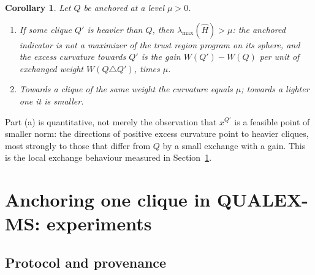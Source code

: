 \documentclass[11pt]{article}
\newtheorem{cor}[thm]{Corollary}
\theoremstyle{definition}
\theoremstyle{remark}
\newcommand{\hH}{\hat{H}}
\newcommand{\lmax}{\lambda_{\max}}
\begin{document}
\begin{cor}
\label{cor:curv}
Let $Q$ be anchored at a level $\mu>0$.
\begin{enumerate}
\item[(a)] If some clique $Q'$ is heavier than $Q$, then $\lmax(\hH)>\mu$:
the anchored indicator is not a maximizer of the trust region program on
its sphere, and the excess curvature towards $Q'$ is the gain
$W(Q')-W(Q)$ per unit of exchanged weight $W(Q\triangle Q')$, times $\mu$.
\item[(b)] Towards a clique of the same weight the curvature equals $\mu$;
towards a lighter one it is smaller.
\end{enumerate}
\end{cor}

Part (a) is quantitative, not merely the observation that $x^{Q'}$ is a
feasible point of smaller norm: the directions of positive excess curvature
point to heavier cliques, most strongly to those that differ from $Q$ by a
small exchange with a gain. This is the local exchange behaviour measured in
Section~\ref{sec:exp}.

\section{Anchoring one clique in QUALEX-MS: experiments}
\label{sec:exp}

\subsection{Protocol and provenance}
\end{document}
